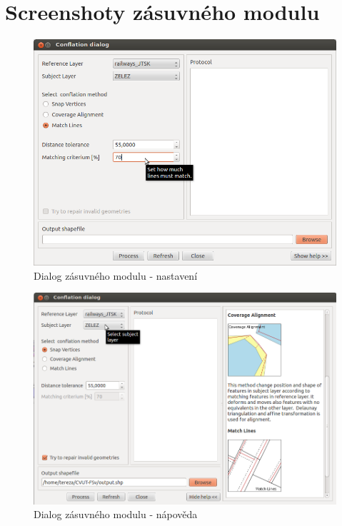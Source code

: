 \chapter{Screenshoty zásuvného modulu}
\label{priloha-screenshoty}

  \begin{figure}[H]
    \centering
      \includegraphics[width=360pt]{./pictures/dialog1.png}
      \caption{Dialog zásuvného modulu - nastavení}
      \label{fig:d1}
  \end{figure} 

  \begin{figure}[H]
    \centering
      \includegraphics[width=360pt]{./pictures/dialog2.png}
      \caption{Dialog zásuvného modulu - nápověda}
      \label{fig:d2}
  \end{figure} 

